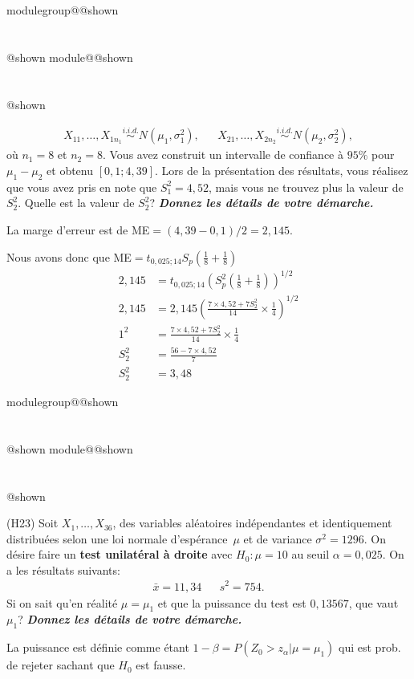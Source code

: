 \documentclass{Evaluation}
\makeatletter
\newcommand{\currentmodulekey}{}
\newcommand{\currentmoduletitle}{}
\newcommand{\currentgroupkey}{}
\newcommand{\currentgrouptitle}{}
\newcommand{\showmoduleifneeded}{%
  \ifx\currentgroupkey\empty\else
    \expandafter\ifx\csname modulegroup@\currentgroupkey @shown\endcsname\relax
      \section*{\currentgrouptitle}%
      \expandafter\gdef\csname modulegroup@\currentgroupkey @shown\endcsname{1}%
    \fi
  \fi
  \expandafter\ifx\csname module@\currentmodulekey @shown\endcsname\relax
    \section*{\currentmoduletitle}%
    \expandafter\gdef\csname module@\currentmodulekey @shown\endcsname{1}%
  \fi
}
\newenvironment{H23}{\showmoduleifneeded}{}
\makeatother
\begin{document}
\begin{questions}
\begin{H23}
\begin{align*}
X_{11}, \ldots, X_{1n_1} \overset{i.i.d.}{\sim} N(\mu_1, \sigma^2_1), & & X_{21}, \ldots, X_{2n_2} \overset{i.i.d.}{\sim} N(\mu_2, \sigma^2_2),
\end{align*}
où $n_1=8$ et $n_2=8$. Vous avez construit un intervalle de confiance à $95\%$ pour $\mu_1-\mu_2$ et obtenu $[0,1; 4,39]$. Lors de la présentation des résultats, vous réalisez que vous avez pris en note que $S^2_1=4,52$, mais vous ne trouvez plus la valeur de $S^2_2$. Quelle est la valeur de $S^2_2$? \textit{\textbf{Donnez les détails de votre démarche.}}

\begin{solution}
    La marge d'erreur est de ME$=(4,39-0,1)/2=2,145$.

    Nous avons donc que ME$=t_{0,025;14}S_p(\frac{1}{8}+\frac{1}{8})$
    \begin{align*}
        2,145&=t_{0,025;14}\left(S_p^2\left(\frac{1}{8}+\frac{1}{8}\right)\right)^{1/2}\\
        2,145&=2,145 \left(\frac{7\times4,52+7 S_2^2}{14} \times \frac{1}{4}\right)^{1/2}\\
        1^2 &= \frac{7\times4,52+7 S_2^2}{14} \times \frac{1}{4}\\
        S_2^2&=\frac{56-7\times 4,52}{7}\\
        S_2^2&=3,48
    \end{align*}
\end{solution}
\end{H23}

\begin{H23}
\question
(H23) Soit $X_1,\hdots, X_{36}$, des variables aléatoires indépendantes et identiquement distribuées selon une loi normale d'espérance~$\mu$ et de variance $\sigma^2=1296$.
On désire faire un \textbf{test unilatéral à droite} avec $H_0:\mu=10$ au seuil $\alpha = 0,025$.
On a les résultats suivants:
\begin{align*}
    \bar{x}= 11,34 &  & s^2=754.
\end{align*}
Si on sait qu'en réalité $\mu=\mu_1$ et que la puissance du test est $0,13567$, que vaut $\mu_1$? \textbf{\textit{Donnez les détails de votre démarche.}}

\begin{solution}
    La puissance est définie comme étant $1-\beta=P(Z_0>z_{\alpha}|\mu=\mu_1)$ qui est prob. de rejeter sachant que $H_0$ est fausse.


\end{solution}
\end{H23}
\end{questions}
\end{document}

